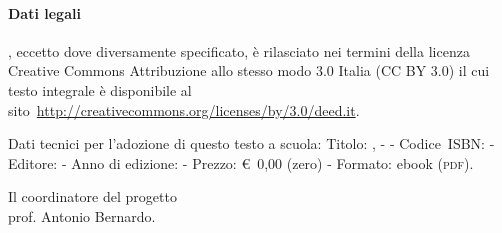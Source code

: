 \paragraph{Dati legali} \serie{}, eccetto dove diversamente specificato, è rilasciato nei termini della licenza Creative Commons Attribuzione allo stesso modo 3.0 Italia (CC BY 3.0) il cui testo integrale è disponibile al sito~\url{http://creativecommons.org/licenses/by/3.0/deed.it}.

Dati tecnici per l'adozione di questo testo a scuola: Titolo: \serie{}, \titolo{} - \edizione{} - Codice~ISBN: \mcisbn{} - Editore: \editore{} - Anno di edizione: \anno{} - Prezzo: €~0,00 (zero) - Formato: ebook ({\scshape{pdf}}).

\begin{flushright}
Il coordinatore del progetto\\
prof. Antonio Bernardo.
\end{flushright}

\cleardoublepage
